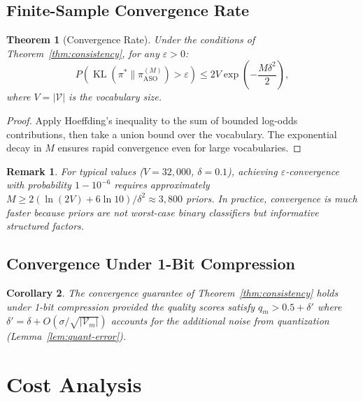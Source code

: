 \documentclass[11pt]{article}
\newtheorem{theorem}{Theorem}
\newtheorem{corollary}[theorem]{Corollary}
\newtheorem{remark}{Remark}
\DeclareMathOperator{\KL}{KL}
\begin{document}
\subsection{Finite-Sample Convergence Rate}

\begin{theorem}[Convergence Rate]
\label{thm:rate}
Under the conditions of Theorem~\ref{thm:consistency}, for any $\varepsilon > 0$:
\begin{equation}
    P\left(\KL(\pi^* \| \pi_{\text{ASO}}^{(M)}) > \varepsilon\right)
    \leq 2V \exp\left(-\frac{M \delta^2}{2}\right),
\end{equation}
where $V = |\mathcal{V}|$ is the vocabulary size.
\end{theorem}

\begin{proof}
Apply Hoeffding's inequality to the sum of bounded log-odds contributions, then
take a union bound over the vocabulary. The exponential decay in $M$ ensures
rapid convergence even for large vocabularies.
\end{proof}

\begin{remark}
For typical values ($V = 32{,}000$, $\delta = 0.1$), achieving
$\varepsilon$-convergence with probability $1 - 10^{-6}$ requires approximately
$M \geq 2(\ln(2V) + 6\ln 10) / \delta^2 \approx 3{,}800$ priors. In practice,
convergence is much faster because priors are not worst-case binary classifiers
but informative structured factors.
\end{remark}

\subsection{Convergence Under 1-Bit Compression}

\begin{corollary}
The convergence guarantee of Theorem~\ref{thm:consistency} holds under 1-bit
compression provided the quality scores satisfy $q_m > 0.5 + \delta'$ where
$\delta' = \delta + O(\sigma / \sqrt{|\mathcal{V}_m|})$ accounts for the
additional noise from quantization (Lemma~\ref{lem:quant-error}).
\end{corollary}

\section{Cost Analysis}
\label{sec:cost}
\end{document}
